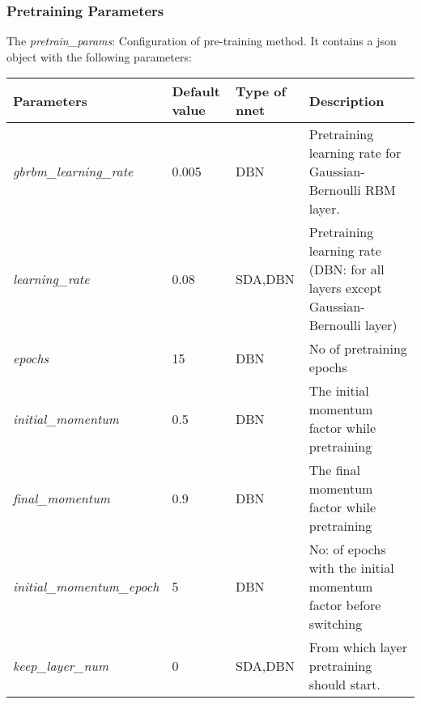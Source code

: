 \subsubsection{Pretraining Parameters}
\label{subsec:pretrainparam}
The \emph{pretrain\_params}: Configuration of pre-training method.  It contains a json object with the following parameters:
\begin{table}[h]
\centering
\begin{tabular}{|l|l|l|p{6cm}|}
\hline
 Parameters	 & Default value	 &  Type	  of nnet & Description\\
\hline
 \emph{gbrbm\_learning\_rate}	 &     0.005	 &    DBN	 & Pretraining learning rate for Gaussian-Bernoulli RBM layer.\\
 \emph{learning\_rate}	 &      0.08	 &  SDA,DBN	 & Pretraining learning rate (DBN: for all layers except Gaussian-Bernoulli layer)\\
 \emph{epochs}	 &       15	 &    DBN	 & No of pretraining epochs\\
 \emph{initial\_momentum}	 &      0.5	 &    DBN	 & The initial momentum factor while pretraining\\
 \emph{final\_momentum}	 &      0.9	 &    DBN	 & The final momentum factor while pretraining\\
 \emph{initial\_momentum\_epoch}	 &       5	 &    DBN	 & No: of epochs with the initial momentum factor before switching\\
 \emph{keep\_layer\_num}	 &       0	 &  SDA,DBN	 & From which layer pretraining should start.\\
 \hline
\end{tabular}
\end{table}

